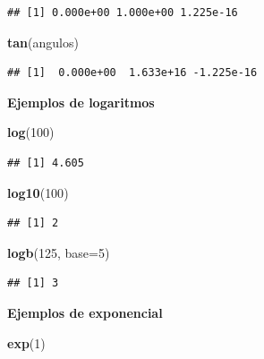 \documentclass[10pt,]{krantz}
\makeatletter
\newenvironment{Shaded}{\begin{snugshade}}{\end{snugshade}}
\newcommand{\KeywordTok}[1]{\textcolor[rgb]{0.13,0.29,0.53}{\textbf{{#1}}}}
\newcommand{\DataTypeTok}[1]{\textcolor[rgb]{0.13,0.29,0.53}{{#1}}}
\newcommand{\DecValTok}[1]{\textcolor[rgb]{0.00,0.00,0.81}{{#1}}}
\newcommand{\NormalTok}[1]{{#1}}
\newenvironment{kframe}{%
\medskip{}
\setlength{\fboxsep}{.8em}
 \def\at@end@of@kframe{}%
 \ifinner\ifhmode%
  \def\at@end@of@kframe{\end{minipage}}%
  \begin{minipage}{\columnwidth}%
 \fi\fi%
 \def\FrameCommand##1{\hskip\@totalleftmargin \hskip-\fboxsep
 \colorbox{shadecolor}{##1}\hskip-\fboxsep
     \hskip-\linewidth \hskip-\@totalleftmargin \hskip\columnwidth}%
 \MakeFramed {\advance\hsize-\width
   \@totalleftmargin\z@ \linewidth\hsize
   \@setminipage}}%
 {\par\unskip\endMakeFramed%
 \at@end@of@kframe}
\renewenvironment{Shaded}{\begin{kframe}}{\end{kframe}}
\makeatother
\begin{document}
\begin{verbatim}
## [1] 0.000e+00 1.000e+00 1.225e-16
\end{verbatim}

\begin{Shaded}
\begin{Highlighting}[]
\KeywordTok{tan}\NormalTok{(angulos)}
\end{Highlighting}
\end{Shaded}

\begin{verbatim}
## [1]  0.000e+00  1.633e+16 -1.225e-16
\end{verbatim}

\textbf{Ejemplos de logaritmos}

\begin{Shaded}
\begin{Highlighting}[]
\KeywordTok{log}\NormalTok{(}\DecValTok{100}\NormalTok{)}
\end{Highlighting}
\end{Shaded}

\begin{verbatim}
## [1] 4.605
\end{verbatim}

\begin{Shaded}
\begin{Highlighting}[]
\KeywordTok{log10}\NormalTok{(}\DecValTok{100}\NormalTok{)}
\end{Highlighting}
\end{Shaded}

\begin{verbatim}
## [1] 2
\end{verbatim}

\begin{Shaded}
\begin{Highlighting}[]
\KeywordTok{logb}\NormalTok{(}\DecValTok{125}\NormalTok{, }\DataTypeTok{base=}\DecValTok{5}\NormalTok{)}
\end{Highlighting}
\end{Shaded}

\begin{verbatim}
## [1] 3
\end{verbatim}

\textbf{Ejemplos de exponencial}

\begin{Shaded}
\begin{Highlighting}[]
\KeywordTok{exp}\NormalTok{(}\DecValTok{1}\NormalTok{)}
\end{Highlighting}
\end{Shaded}
\end{document}
